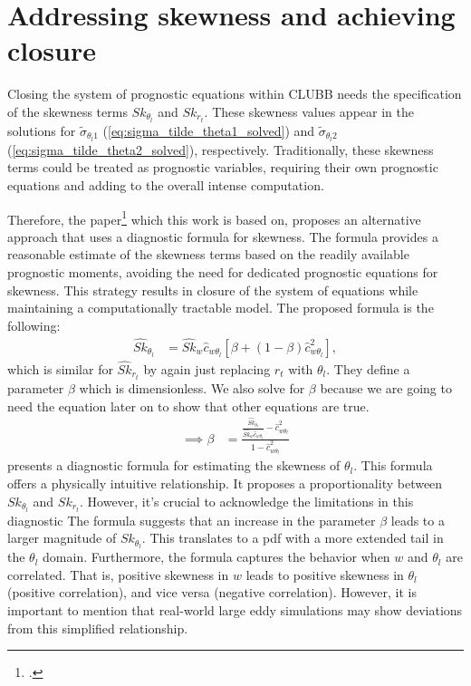 \section{Addressing skewness and achieving closure}
\label{sec:addressing-skeweness-and-achieving-closure}

Closing the system of prognostic equations within \gls{CLUBB} needs the specification of
the skewness terms $Sk_{\theta_l}$ and $Sk_{r_t}$.
These skewness values appear in the solutions for $\tilde{\sigma}_{\theta_l 1}$ (\cref{eq:sigma_tilde_theta1_solved})
and $\tilde{\sigma}_{\theta_l 2}$ (\cref{eq:sigma_tilde_theta2_solved}), respectively.
Traditionally, these skewness terms could be treated as prognostic variables,
requiring their own prognostic equations and adding to the overall intense computation.

Therefore, the paper\footcite{larson2005using} which this work is based on,
proposes an alternative approach that uses a diagnostic formula for skewness.
The formula provides a reasonable estimate of the skewness terms
based on the readily available prognostic moments,
avoiding the need for dedicated prognostic equations for skewness.
This strategy results in closure of the system of equations
while maintaining a computationally tractable model.
The proposed formula is the following:
\begin{align}
    \label{eq:Sk_hat_thl_beta}
    \widehat{Sk}_{\theta_l}
    &= \widehat{Sk}_w \widehat{c}_{w \theta_l} \left[\beta + (1-\beta) \widehat{c}_{w \theta_l}^2 \right],
\end{align}
which is similar for $\widehat{Sk}_{r_t}$ by again just replacing $r_t$ with $\theta_l$.
They define a parameter $\beta$ which is dimensionless.
We also solve for $\beta$ because we are going to need the equation later on to show that other equations are true.
\begin{align}
    \label{eq:beta}
    \implies \beta
    &=\frac{
        \frac{\widehat{Sk}_{\theta_l}}{\widehat{Sk}_w \widehat{c}_{w \theta_l}} - \widehat{c}_{w \theta_l}^2}
    {1 - \widehat{c}_{w \theta_l}^2}
\end{align}
 presents a diagnostic formula for estimating the skewness of $\theta_l$.
This formula offers a physically intuitive relationship.
It proposes a proportionality between $Sk_{\theta_l}$ and $Sk_{r_t}$.
However, it's crucial to acknowledge the limitations in this diagnostic
The formula suggests that an increase in the parameter $\beta$ leads to a larger magnitude of $Sk_{\theta_l}$.
This translates to a \gls{pdf} with a more extended tail in the $\theta_l$ domain.
Furthermore, the formula captures the behavior when $w$
and $\theta_l$ are correlated.
That is, positive skewness in $w$ leads to positive skewness in $\theta_l$ (positive correlation),
and vice versa (negative correlation).
However, it is important to mention that real-world large eddy simulations
may show deviations from this simplified relationship.

